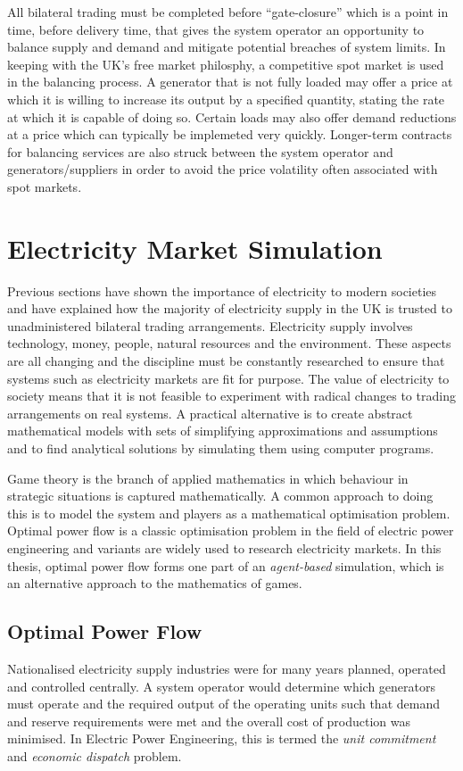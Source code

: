 All bilateral trading must be completed before ``gate-closure'' which is a
point in time, before delivery time, that gives the system operator an
opportunity to balance supply and demand and mitigate potential breaches of
system limits.  In keeping with the UK's free market philosphy, a competitive
spot market \cite{schweppe:spot} is used in the balancing process.  A
generator that is not fully loaded may offer a price at which it is willing to
increase its output by a specified quantity, stating the rate at which it is
capable of doing so.  Certain loads may also offer demand reductions at a
price which can typically be implemeted very quickly.  Longer-term contracts
for balancing services are also struck between the system operator and
generators/suppliers in order to avoid the price volatility often associated
with spot markets.

\section{Electricity Market Simulation}
Previous sections have shown the importance of electricity to
modern societies and have explained how the majority of
electricity supply in the UK is trusted to unadministered bilateral trading
arrangements. Electricity supply involves technology, money, people, natural resources and the environment.  These aspects are all changing
and the discipline must be constantly researched to ensure that systems such as
electricity markets are fit for purpose.  The value of electricity to society
means that it is not feasible to experiment with radical changes to trading
arrangements on real systems.  A practical alternative is to create abstract
mathematical models with sets of simplifying approximations and assumptions
and to find analytical solutions by simulating them using computer programs.

Game theory is the branch of applied mathematics in which behaviour in
strategic situations is captured mathematically.  A common approach to doing
this is to model the system and players as a mathematical optimisation problem.  Optimal
power flow is a classic optimisation problem in the field of electric
power engineering and variants are widely used to research electricity
markets.  In this thesis, optimal power flow forms one part of an
\textit{agent-based} simulation, which is an alternative approach to the
mathematics of games.

\subsection{Optimal Power Flow}
\label{sec:opf}
Nationalised electricity supply industries were for many years planned,
operated and controlled centrally.  A system operator would determine which
generators must operate and the required output of the operating units such
that demand and reserve requirements were met and the overall cost of
production was minimised.  In Electric Power Engineering, this is termed the
\textit{unit commitment} and \textit{economic dispatch} problem.

